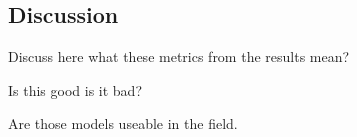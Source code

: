\subsection{Discussion}
\label{chp:study:sec:interpretation:subsec:discussion}

Discuss here what these metrics from the results mean?

Is this good is it bad?

Are those models useable in the field.
